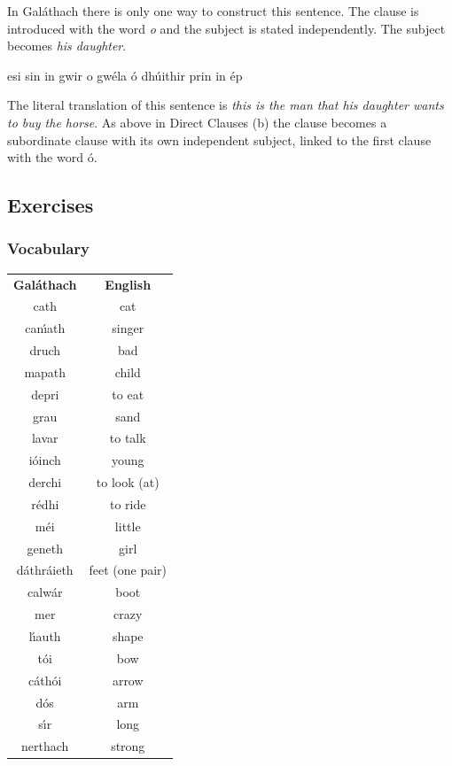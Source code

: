 In Gal\'{a}thach there is only one way to construct this sentence. The clause is introduced with the word \textit{o} and the subject is stated independently. The subject becomes \textit{his daughter}.

esi sin in gwir o gw\'{e}la \'{o} dh\'{u}ithir prin in \'{e}p

The literal translation of this sentence is \textit{this is the man that his daughter wants to buy the horse}. As above in Direct Clauses (b) the clause becomes a subordinate clause with its own independent subject, linked to the first clause with the word \'{o}.

\newpage
\subsection{Exercises}

\subsubsection{Vocabulary}

\begin{table}[H]
\centering
\begin{tabular}{cc}
  \toprule
  \textbf{Gal\'{a}thach} & \textbf{English}\\
  \cmidrule(lr){1-1}\cmidrule(lr){2-2}
  cath & cat\\
  can\'{\i}ath & singer\\
  druch & bad\\
  mapath & child\\
  depri & to eat\\
  grau & sand\\
  lavar & to talk\\
  i\'{o}inch & young\\
  derchi & to look (at)\\
  r\'{e}dhi & to ride\\
  m\'{e}i & little\\
  geneth & girl\\
  d\'{a}thr\'{a}ieth & feet (one pair)\\
  calw\'{a}r & boot\\
  mer & crazy\\
  l\'{\i}auth & shape\\
  t\'{o}i & bow\\
  c\'{a}th\'{o}i & arrow\\
  d\'{o}s & arm\\
  s\'{\i}r & long\\
  nerthach & strong\\
  \bottomrule
\end{tabular}
\label{vocab_indirect_clauses}
\end{table}

